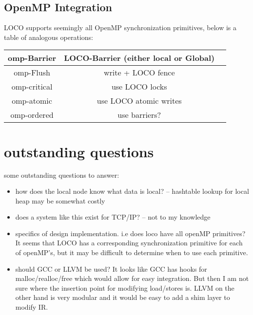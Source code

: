 \documentclass[sigplan,nonacm]{acmart}
\begin{document}
\subsection{OpenMP Integration}
LOCO supports seemingly all OpenMP synchronization primitives, below is a table of 
analogous operations:

\begin{center}
    \begin{tabular}{ |c|c|c| } 
     \hline
     omp-Barrier & LOCO-Barrier (either local or Global) \\ 
     \hline
     omp-Flush & write + LOCO fence\\ 
     \hline
     omp-critical & use LOCO locks \\ 
     \hline
     omp-atomic & use LOCO atomic writes \\
     \hline
     omp-ordered & use barriers? \\
     \hline
    \end{tabular}
\end{center}


\section{outstanding questions}
some outstanding questions to answer:
\begin{itemize}
    \item how does the local node know what data is local? -- hashtable lookup for local heap 
    may be somewhat costly
    \item does a system like this exist for TCP/IP? -- not to my knowledge
    \item specifics of design implementation. i.e does loco have all openMP primitives? It 
    seems that LOCO has a corresponding synchronization primitive for each of openMP's, but it 
    may be difficult to determine when to use each primitive.
    \item should GCC or LLVM be used? It looks like GCC has hooks for malloc/realloc/free which 
    would allow for easy integration. But then I am not sure where the insertion point for modifying 
    load/stores is. LLVM on the other hand is very modular and it would be easy to add a shim layer 
    to modify IR. 
\end{itemize}
\end{document}
